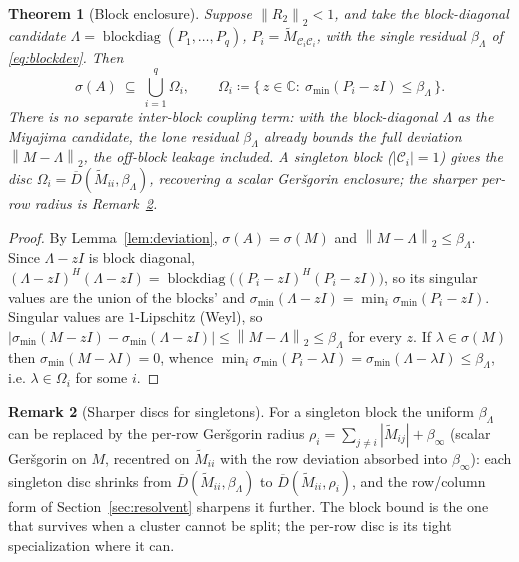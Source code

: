\documentclass[11pt,a4paper]{article}
\newcommand{\norm}[1]{\left\|#1\right\|}
\newcommand{\abs}[1]{\left|#1\right|}
\newcommand{\C}{\mathbb{C}}
\newcommand{\spec}{\sigma}
\theoremstyle{plain}
\newtheorem{theorem}{Theorem}[section]
\theoremstyle{definition}
\newtheorem{remark}[theorem]{Remark}
\begin{document}
\begin{theorem}[Block enclosure]\label{thm:enclosure}
Suppose $\norm{R_2}_2<1$, and take the block-diagonal candidate
$\Lambda=\operatorname{blockdiag}(P_1,\dots,P_q)$, $P_i=\widetilde M_{\mathcal C_i\mathcal C_i}$,
with the single residual $\beta_\Lambda$ of \eqref{eq:blockdev}. Then
\[
  \spec(A)\ \subseteq\ \bigcup_{i=1}^{q}\Omega_i,
  \qquad \Omega_i\coloneqq\big\{\,z\in\C:\ \sigma_{\min}(P_i-zI)\le\beta_\Lambda\,\big\}.
\]
There is \emph{no} separate inter-block coupling term: with the block-diagonal $\Lambda$ as
the Miyajima candidate, the lone residual $\beta_\Lambda$ already bounds the full deviation
$\norm{M-\Lambda}_2$, the off-block leakage included. A singleton block
($\abs{\mathcal C_i}=1$) gives the disc $\Omega_i=\overline D(\widetilde M_{ii},\beta_\Lambda)$,
recovering a scalar Ger\v sgorin enclosure; the sharper per-row radius is
Remark~\ref{rem:sharpdisc}.
\end{theorem}

\begin{proof}
By Lemma~\ref{lem:deviation}, $\spec(A)=\spec(M)$ and $\norm{M-\Lambda}_2\le\beta_\Lambda$.
Since $\Lambda-zI$ is block diagonal,
$(\Lambda-zI)^H(\Lambda-zI)=\operatorname{blockdiag}\big((P_i-zI)^H(P_i-zI)\big)$, so its
singular values are the union of the blocks' and
$\sigma_{\min}(\Lambda-zI)=\min_i\sigma_{\min}(P_i-zI)$. Singular values are $1$-Lipschitz
(Weyl), so $\big|\sigma_{\min}(M-zI)-\sigma_{\min}(\Lambda-zI)\big|\le\norm{M-\Lambda}_2\le\beta_\Lambda$
for every $z$. If $\lambda\in\spec(M)$ then $\sigma_{\min}(M-\lambda I)=0$, whence
$\min_i\sigma_{\min}(P_i-\lambda I)=\sigma_{\min}(\Lambda-\lambda I)\le\beta_\Lambda$, i.e.
$\lambda\in\Omega_i$ for some $i$.
\end{proof}

\begin{remark}[Sharper discs for singletons]\label{rem:sharpdisc}
For a singleton block the uniform $\beta_\Lambda$ can be replaced by the per-row Ger\v sgorin
radius $\rho_i=\sum_{j\ne i}\abs{\widetilde M_{ij}}+\beta_\infty$ (scalar Ger\v sgorin on
$M$, recentred on $\widetilde M_{ii}$ with the row deviation absorbed into $\beta_\infty$): each
singleton disc shrinks from $\overline D(\widetilde M_{ii},\beta_\Lambda)$ to
$\overline D(\widetilde M_{ii},\rho_i)$, and the row/column form of
Section~\ref{sec:resolvent} sharpens it further. The block bound is the one that survives
when a cluster cannot be split; the per-row disc is its tight specialization where it can.
\end{remark}
\end{document}
